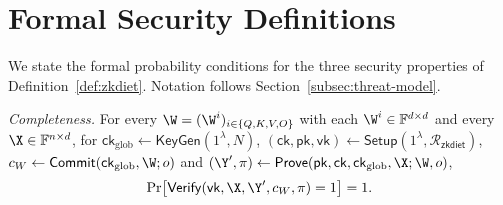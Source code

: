 \documentclass[runningheads]{llncs}
\begin{document}
\begin{table}[H]
\centering
\caption{\textbf{MLP\,+\,LayerNorm} costs for the Tiny configuration ($L{=}2$, $d{=}128$).}
\label{tab:mlp-costs}
\end{table}

\section{Formal Security Definitions}
\label{appx:security-defs}

We state the formal probability conditions for the three security properties of Definition~\ref{def:zkdiet}. Notation follows Section~\ref{subsec:threat-model}.

\smallskip
\noindent\emph{Completeness.} For every $\W = (\W^{i})_{i \in \{Q,K,V,O\}}$ with each $\W^{i} \in \mathbb{F}^{d \times d}$ and every $\X \in \mathbb{F}^{n \times d}$, for $\mathsf{ck}_{\mathrm{glob}} \leftarrow \mathsf{KeyGen}(1^{\lambda}, N)$, $(\mathsf{ck}, \mathsf{pk}, \mathsf{vk}) \leftarrow \mathsf{Setup}(1^{\lambda}, \mathcal{R}_{\mathsf{zkdiet}})$, $c_{W} \leftarrow \mathsf{Commit}(\mathsf{ck}_{\mathrm{glob}}, \W; o)$ and $(\Y', \pi) \leftarrow \mathsf{Prove}(\mathsf{pk}, \mathsf{ck}, \mathsf{ck}_{\mathrm{glob}}, \X; \W, o)$,
\[
    \Pr\bigl[\mathsf{Verify}(\mathsf{vk}, \X, \Y', c_{W}, \pi) = 1\bigr] = 1 .
\]
\end{document}
